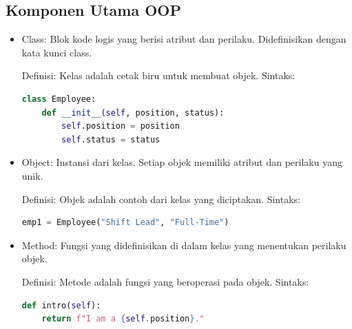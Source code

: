 \documentclass{article}
\begin{document}
\subsection{Komponen Utama OOP}
\begin{itemize}
    \item Class: Blok kode logis yang berisi atribut dan perilaku. Didefinisikan dengan kata kunci class.

          Definisi: Kelas adalah cetak biru untuk membuat objek.
          Sintaks:
          \begin{lstlisting}[language=Python, caption={}, captionpos=b]
class Employee:
    def __init__(self, position, status):
        self.position = position
        self.status = status
\end{lstlisting}
    \item Object: Instansi dari kelas. Setiap objek memiliki atribut dan perilaku yang unik.

          Definisi: Objek adalah contoh dari kelas yang diciptakan.
          Sintaks:
          \begin{lstlisting}[language=Python, caption={}, captionpos=b]
emp1 = Employee("Shift Lead", "Full-Time")
\end{lstlisting}
    \item Method: Fungsi yang didefinisikan di dalam kelas yang menentukan perilaku objek.

          Definisi: Metode adalah fungsi yang beroperasi pada objek.
          Sintaks:
          \begin{lstlisting}[language=Python, caption={}, captionpos=b]
def intro(self):
    return f"I am a {self.position}."
\end{lstlisting}
\end{itemize}
\end{document}
